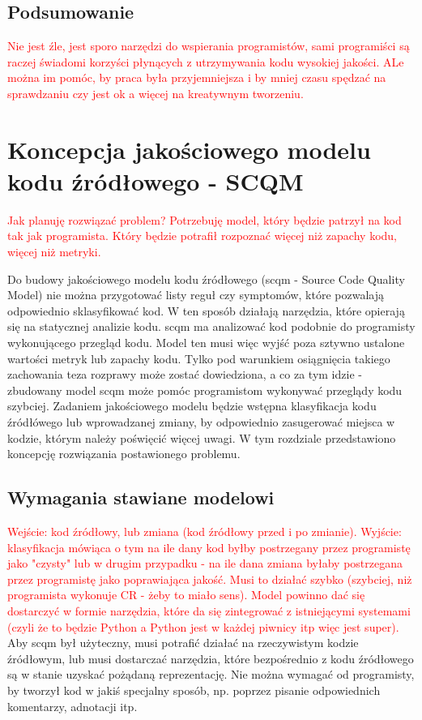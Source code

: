 \documentclass[12pt]{report}
\begin{document}
\section{Podsumowanie}
\textcolor{red}{Nie jest źle, jest sporo narzędzi do wspierania programistów, sami programiści są raczej świadomi korzyści płynących z utrzymywania kodu wysokiej jakości. ALe można im pomóc, by praca była przyjemniejsza i by mniej czasu spędzać na sprawdzaniu czy jest ok a więcej na kreatywnym tworzeniu.}


\chapter{Koncepcja jakościowego modelu kodu źródłowego - SCQM}
\label{ch:proj}

\textcolor{red}{Jak planuję rozwiązać problem? Potrzebuję model, który będzie patrzył na kod tak jak programista. Który będzie potrafił rozpoznać więcej niż zapachy kodu, więcej niż metryki.}

Do budowy jakościowego modelu kodu źródłowego (\gls{scqm} - Source Code Quality Model) nie można przygotować listy reguł czy symptomów, które pozwalają odpowiednio sklasyfikować kod. W ten sposób działają narzędzia, które opierają się na statycznej analizie kodu. \gls{scqm} ma analizować kod podobnie do programisty wykonującego przegląd kodu. Model ten musi więc wyjść poza sztywno ustalone wartości metryk lub zapachy kodu. Tylko pod warunkiem osiągnięcia takiego zachowania teza rozprawy może zostać dowiedziona, a co za tym idzie - zbudowany model \gls{scqm} może pomóc programistom wykonywać przeglądy kodu szybciej. Zadaniem jakościowego modelu będzie wstępna klasyfikacja kodu źródłówego lub wprowadzanej zmiany, by odpowiednio zasugerować miejsca w kodzie, którym należy poświęcić więcej uwagi. W tym rozdziale przedstawiono koncepcję rozwiązania postawionego problemu.

\section{Wymagania stawiane modelowi}
\label{sec:proj:requirements}
\textcolor{red}{Wejście: kod źródłowy, lub zmiana (kod źródłowy przed i po zmianie). Wyjście: klasyfikacja mówiąca o tym na ile dany kod byłby postrzegany przez programistę jako "czysty" lub w drugim przypadku - na ile dana zmiana byłaby postrzegana przez programistę jako poprawiająca jakość. Musi to działać szybko (szybciej, niż programista wykonuje CR - żeby to miało sens). Model powinno dać się dostarczyć w formie narzędzia, które da się zintegrować z istniejącymi systemami (czyli że to będzie Python a Python jest w każdej piwnicy itp więc jest super).}
Aby \gls{scqm} był użyteczny, musi potrafić działać na rzeczywistym kodzie źródłowym, lub musi dostarczać narzędzia, które bezpośrednio z kodu źródłowego są w stanie uzyskać pożądaną reprezentację. Nie można wymagać od programisty, by tworzył kod w jakiś specjalny sposób, np. poprzez pisanie odpowiednich komentarzy, adnotacji itp.
\end{document}
